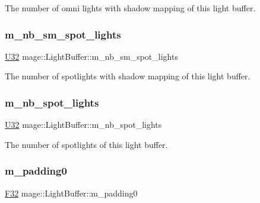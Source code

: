 The number of omni lights with shadow mapping of this light buffer. \hypertarget{structmage_1_1_light_buffer_a12ef0995fa34d6d132402ff5ab651b9b}{}\label{structmage_1_1_light_buffer_a12ef0995fa34d6d132402ff5ab651b9b} 
\subsubsection{\texorpdfstring{m\+\_\+nb\+\_\+sm\+\_\+spot\+\_\+lights}{m\_nb\_sm\_spot\_lights}}
{\footnotesize\ttfamily \hyperlink{namespacemage_a41c104c036fba3756a74e19f793eeaa1}{U32} mage\+::\+Light\+Buffer\+::m\+\_\+nb\+\_\+sm\+\_\+spot\+\_\+lights}

The number of spotlights with shadow mapping of this light buffer. \hypertarget{structmage_1_1_light_buffer_a33b37a8de8ebd92ad4911d68e836f79f}{}\label{structmage_1_1_light_buffer_a33b37a8de8ebd92ad4911d68e836f79f} 
\subsubsection{\texorpdfstring{m\+\_\+nb\+\_\+spot\+\_\+lights}{m\_nb\_spot\_lights}}
{\footnotesize\ttfamily \hyperlink{namespacemage_a41c104c036fba3756a74e19f793eeaa1}{U32} mage\+::\+Light\+Buffer\+::m\+\_\+nb\+\_\+spot\+\_\+lights}

The number of spotlights of this light buffer. \hypertarget{structmage_1_1_light_buffer_a119f009dc4bdc39c32ea7d3c439b72f8}{}\label{structmage_1_1_light_buffer_a119f009dc4bdc39c32ea7d3c439b72f8} 
\subsubsection{\texorpdfstring{m\+\_\+padding0}{m\_padding0}}
{\footnotesize\ttfamily \hyperlink{namespacemage_aa97e833b45f06d60a0a9c4fc22ae02c0}{F32} mage\+::\+Light\+Buffer\+::m\+\_\+padding0}

